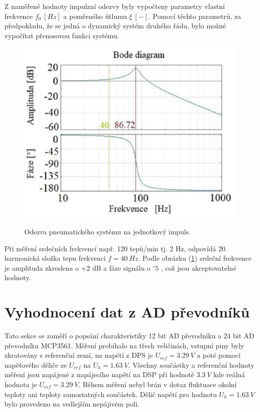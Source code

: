 Z naměřené hodnoty impulzní odezvy byly vypočteny parametry vlastní frekvence $f_0 \ [Hz]$ a poměrného útlumu $\xi \ [-]$. Pomocí těchto parametrů, za předpokladu, že se jedná o dynamický systém druhého řádu, bylo možné vypočítat přenosovou funkci systému.\cite{cite:Patricia}
\begin{figure}[H]
    \caption{Odezva pneumatického systému na jednotkový impuls. \cite{cite:Patricia}}
    \includegraphics[width=1\textwidth]{pictures/freq_char_pneu.png}
    \label{fig:pneu_freq_char}
\end{figure}
Při měření srdečních frekvencí např. 120 tepů/min tj. 2 Hz, odpovídá 20. harmonická složka tepu frekvenci $f = 40 \ Hz$. Podle obrázku (\ref{fig:pneu_freq_char}) srdeční frekvence je amplituda zkreslena o +2 dB a fáze signálu o $^\circ 5$ \cite{cite:Patricia}, což jsou akceptovatelné hodnoty.

%
%
%
%
\pagebreak
\section{Vyhodnocení dat z AD převodníků}
Tato sekce se zaměří o popsání charakteristiky 12 bit AD převodníku a 24 bit AD převodníku MCP3561. Měření probíhalo na třech veličinách, vstupní piny byly zkratovány s referenční zemí, na napětí z DPS je $U_{ref} = 3.29 \ V$ a poté pomocí napěťového děliče ze $U_{ref}$ na $U_{h} = 1.63 \ V$.
Všechny součástky a referenční hodnoty měření jsou napájené z napájecího napětí na DSP při hodnotě $3.3 \ V$ kde reálná hodnota je $U_{ref} = 3.29 \ V$. Během měření nebyl brán v dotaz fluktuace okolní teploty ani teploty samostatných součástek. Dělič napětí pro hodnotu $U_{h} = 1.63 \ V$ bylo provedeno na vedlejším nepájivém poli.

